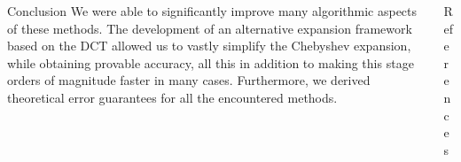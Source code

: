 \documentclass[final, 12pt]{beamer}
\begin{document}
\begin{frame}[t]
\begin{columns}[t]
    \begin{column}{0.45\paperwidth}
        \begin{block}{Conclusion}
            We were able to significantly improve many algorithmic aspects of these
            methods. The development of an alternative expansion framework based on
            the \gls{DCT} allowed us to vastly simplify the Chebyshev expansion,
            while obtaining provable accuracy, all
            this in addition to making this stage orders of magnitude faster in many cases.
            Furthermore, we derived theoretical error guarantees for all the encountered methods.
        \end{block}
    \end{column}
    \begin{column}{0.45\paperwidth}
        \begin{block}{References}
            \vspace{-10pt}
            
        
        \end{block}
    \end{column}
\end{columns}

\end{frame}
\end{document}
